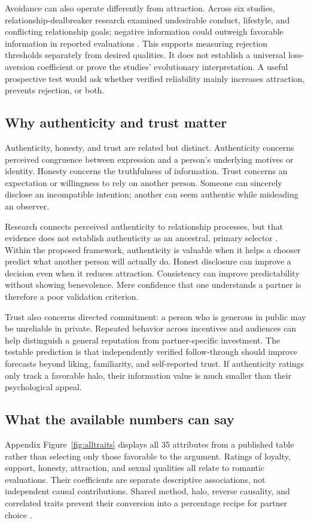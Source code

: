 \documentclass[10pt,twocolumn,letterpaper]{article}
\begin{document}
Avoidance can also operate differently from attraction. Across six studies, relationship-dealbreaker research examined undesirable conduct, lifestyle, and conflicting relationship goals; negative information could outweigh favorable information in reported evaluations \citep{dealbreakers2015}. This supports measuring rejection thresholds separately from desired qualities. It does not establish a universal loss-aversion coefficient or prove the studies' evolutionary interpretation. A useful prospective test would ask whether verified reliability mainly increases attraction, prevents rejection, or both.

\subsection{Why authenticity and trust matter}
Authenticity, honesty, and trust are related but distinct. Authenticity concerns perceived congruence between expression and a person's underlying motives or identity. Honesty concerns the truthfulness of information. Trust concerns an expectation or willingness to rely on another person. Someone can sincerely disclose an incompatible intention; another can seem authentic while misleading an observer.

Research connects perceived authenticity to relationship processes, but that evidence does not establish authenticity as an ancestral, primary selector \citep{wickham,wickham2020}. Within the proposed framework, authenticity is valuable when it helps a chooser predict what another person will actually do. Honest disclosure can improve a decision even when it reduces attraction. Consistency can improve predictability without showing benevolence. Mere confidence that one understands a partner is therefore a poor validation criterion.

Trust also concerns directed commitment: a person who is generous in public may be unreliable in private. Repeated behavior across incentives and audiences can help distinguish a general reputation from partner-specific investment. The testable prediction is that independently verified follow-through should improve forecasts beyond liking, familiarity, and self-reported trust. If authenticity ratings only track a favorable halo, their information value is much smaller than their psychological appeal.

\subsection{What the available numbers can say}
Appendix Figure~\ref{fig:alltraits} displays all 35 attributes from a published table rather than selecting only those favorable to the argument. Ratings of loyalty, support, honesty, attraction, and sexual qualities all relate to romantic evaluations. Their coefficients are separate descriptive associations, not independent causal contributions. Shared method, halo, reverse causality, and correlated traits prevent their conversion into a percentage recipe for partner choice \citep{matching2025}.
\end{document}
